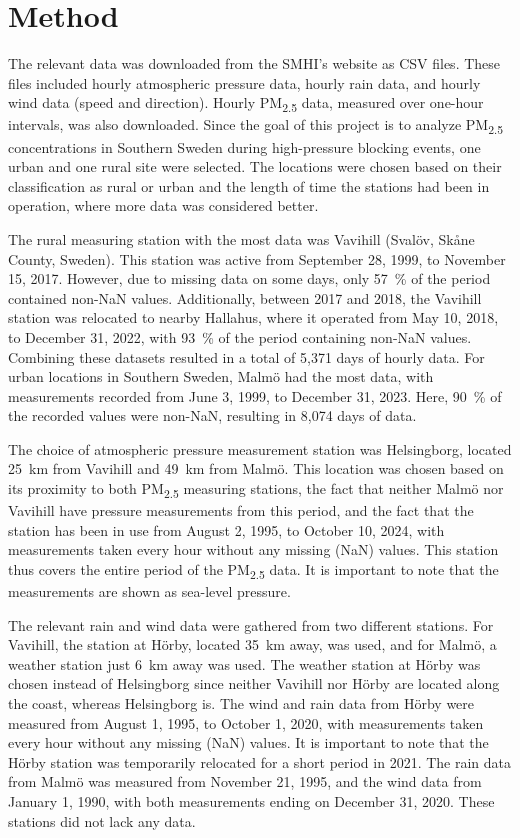 \newpage
\section{Method}
The relevant data was downloaded from the SMHI’s website as CSV files. These files included hourly atmospheric pressure data, hourly rain data, and hourly wind data (speed and direction). Hourly PM\textsubscript{2.5} data, measured over one-hour intervals, was also downloaded. Since the goal of this project is to analyze PM\textsubscript{2.5} concentrations in Southern Sweden during high-pressure blocking events, one urban and one rural site were selected. The locations were chosen based on their classification as rural or urban and the length of time the stations had been in operation, where more data was considered better. 

The rural measuring station with the most data was Vavihill (Svalöv, Skåne County, Sweden). This station was active from September 28, 1999, to November 15, 2017. However, due to missing data on some days, only \SI{57}{\%} of the period contained non-NaN values. Additionally, between 2017 and 2018, the Vavihill station was relocated to nearby Hallahus, where it operated from May 10, 2018, to December 31, 2022, with \SI{93}{\%} of the period containing non-NaN values. Combining these datasets resulted in a total of 5,371 days of hourly data. For urban locations in Southern Sweden, Malmö had the most data, with measurements recorded from June 3, 1999, to December 31, 2023. Here, \SI{90}{\%} of the recorded values were non-NaN, resulting in 8,074 days of data.

The choice of atmospheric pressure measurement station was Helsingborg, located \SI{25}{\km} from Vavihill and \SI{49}{\km} from Malmö. This location was chosen based on its proximity to both PM\textsubscript{2.5} measuring stations, the fact that neither Malmö nor Vavihill have pressure measurements from this period, and the fact that the station has been in use from August 2, 1995, to October 10, 2024, with measurements taken every hour without any missing (NaN) values. This station thus covers the entire period of the PM\textsubscript{2.5} data. It is important to note that the measurements are shown as sea-level pressure.

The relevant rain and wind data were gathered from two different stations. For Vavihill, the station at Hörby, located \SI{35}{\km} away, was used, and for Malmö, a weather station just \SI{6}{\km} away was used. The weather station at Hörby was chosen instead of Helsingborg since neither Vavihill nor Hörby are located along the coast, whereas Helsingborg is. The wind and rain data from Hörby were measured from August 1, 1995, to October 1, 2020, with measurements taken every hour without any missing (NaN) values. It is important to note that the Hörby station was temporarily relocated for a short period in 2021. The rain data from Malmö was measured from November 21, 1995, and the wind data from January 1, 1990, with both measurements ending on December 31, 2020. These stations did not lack any data.

